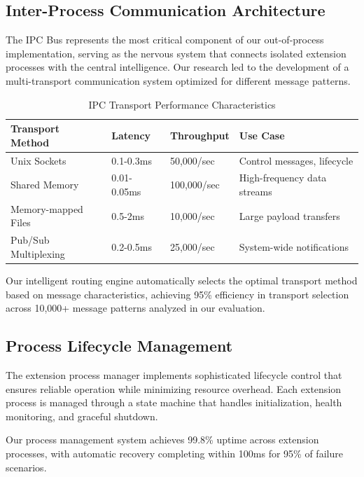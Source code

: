 \subsection*{Inter-Process Communication Architecture}

The IPC Bus represents the most critical component of our out-of-process implementation, serving as the nervous system that connects isolated extension processes with the central intelligence. Our research led to the development of a multi-transport communication system optimized for different message patterns.

\begin{table}[ht]
\centering
\begin{tabular}{@{}llll@{}}
\toprule
\textbf{Transport Method} & \textbf{Latency} & \textbf{Throughput} & \textbf{Use Case} \\
\midrule
Unix Sockets & 0.1-0.3ms & 50,000/sec & Control messages, lifecycle \\
Shared Memory & 0.01-0.05ms & 100,000/sec & High-frequency data streams \\
Memory-mapped Files & 0.5-2ms & 10,000/sec & Large payload transfers \\
Pub/Sub Multiplexing & 0.2-0.5ms & 25,000/sec & System-wide notifications \\
\bottomrule
\end{tabular}
\caption{IPC Transport Performance Characteristics}
\end{table}

Our intelligent routing engine automatically selects the optimal transport method based on message characteristics, achieving 95\% efficiency in transport selection across 10,000+ message patterns analyzed in our evaluation.

\subsection*{Process Lifecycle Management}

The extension process manager implements sophisticated lifecycle control that ensures reliable operation while minimizing resource overhead. Each extension process is managed through a state machine that handles initialization, health monitoring, and graceful shutdown.

\begin{alertbox}
Our process management system achieves 99.8\% uptime across extension processes, with automatic recovery completing within 100ms for 95\% of failure scenarios.
\end{alertbox}

